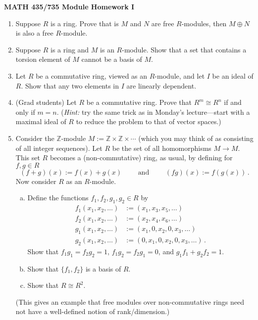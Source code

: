 \documentclass[11pt]{article}
\def\Z{\mathbb{Z}}
\begin{document}
\setlength{\parindent}{0pt}
\setlength{\parskip}{0.4cm}

\thispagestyle{empty} 

\begin{center} {\bf MATH 435/735 \qquad \qquad Module Homework I} \end{center} 

\begin{enumerate}[(1)]

\item Suppose $R$ is a ring. Prove that is $M$ and $N$ are free $R$-modules, then $M \oplus N$ is also a free $R$-module.

\item Suppose $R$ is a ring and $M$ is an $R$-module. Show that a set that contains a torsion element of $M$ cannot be a basis of $M$.

\item Let $R$ be a commutative ring, viewed as an $R$-module, and let $I$ be an ideal of $R$. Show that any two elements in $I$ are linearly dependent. 

\item (Grad students)
Let $R$ be a commutative ring. Prove that $R^m \cong R^n$ if and only if $m=n$.
(\emph{Hint:} try the same trick as in Monday's lecture---start with a maximal ideal of $R$ to reduce the problem to that of vector spaces.)

\item 
Consider the $\Z$-module $M := \Z \times \Z \times \cdots$
(which you may think of as consisting of all integer sequences).
Let $R$ be the set of all homomorphisms $M \to M$.
This set $R$ becomes a (non-commutative) ring, as usual, by defining for $f, g \in R$
\[
  (f+g)(x) := f(x) + g(x)
  \qquad \text{ and } \qquad
  (fg)(x) := f(g(x)) \, .
\]
Now consider $R$ as an $R$-module.
\begin{enumerate}[(a)]
  \item Define the functions $f_1, f_2, g_1, g_2 \in R$ by
\begin{align*}
  f_1(x_1, x_2, \dots) &:= (x_1, x_3, x_5, \dots) \\
  f_2(x_1, x_2, \dots) &:= (x_2, x_4, x_6, \dots) \\
  g_1(x_1, x_2, \dots) &:= (x_1, 0, x_2, 0, x_3, \dots) \\
  g_2(x_1, x_2, \dots) &:= (0, x_1, 0, x_2, 0, x_3, \dots) \, .
\end{align*}
  Show that $f_1 g_1 = f_2 g_2 = 1$, $f_1 g_2 = f_2 g_1 = 0$, and $g_1 f_1 + g_2 f_2 = 1$.
  \item Show that $\{ f_1, f_2 \}$ is a basis of $R$.
  \item Show that $R \cong R^2$.
\end{enumerate}
(This gives an example that free modules over non-commutative rings need not have a well-defined notion of rank/dimension.)

\end{enumerate}
\end{document}
